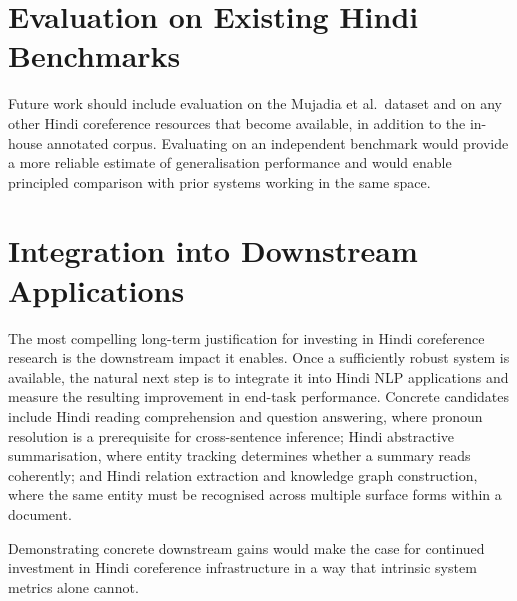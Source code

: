 \documentclass[12pt,a4paper]{report}
\begin{document}
\section{Evaluation on Existing Hindi Benchmarks}

Future work should include evaluation on the Mujadia et al.\ dataset \cite{mujadia2016hindi} and on any other Hindi coreference resources that become available, in addition to the in-house annotated corpus. Evaluating on an independent benchmark would provide a more reliable estimate of generalisation performance and would enable principled comparison with prior systems working in the same space.

\section{Integration into Downstream Applications}

The most compelling long-term justification for investing in Hindi coreference research is the downstream impact it enables. Once a sufficiently robust system is available, the natural next step is to integrate it into Hindi NLP applications and measure the resulting improvement in end-task performance. Concrete candidates include Hindi reading comprehension and question answering, where pronoun resolution is a prerequisite for cross-sentence inference; Hindi abstractive summarisation, where entity tracking determines whether a summary reads coherently; and Hindi relation extraction and knowledge graph construction, where the same entity must be recognised across multiple surface forms within a document.

Demonstrating concrete downstream gains would make the case for continued investment in Hindi coreference infrastructure in a way that intrinsic system metrics alone cannot.
\end{document}
